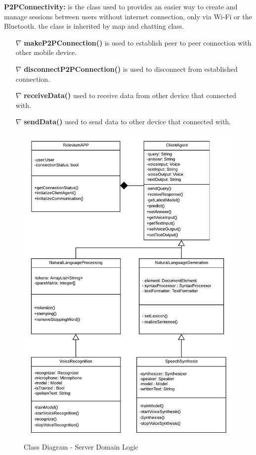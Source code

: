 \documentclass{scrreprt}
\begin{document}
\textbf{P2PConnectivity:} is the class used to  provides an easier way to create and manage sessions between users without internet connection, only via Wi-Fi or the Bluetooth. the class is inherited by map and chatting class.

\begin{itemize}


\item[$\nabla$] \textbf{makeP2PConnection()} is used to establish peer to peer connection with other mobile device.
\item[$\nabla$] \textbf{disconnectP2PConnection()} is used to disconnect from established connection.
\item[$\nabla$] \textbf{receiveData()} used to receive data from other device that connected with.
\item[$\nabla$] \textbf{sendData()} used to send data to other device that  connected with.
\end{itemize}
\clearpage

\begin{figure}[ht!]
    \includegraphics[height=.95\textheight]{img3/ClassDClass1DIV.pdf}
    \caption{Class Diagram - Server Domain Logic}
    \label{fig:classdiagram2}
\end{figure}
\end{document}
